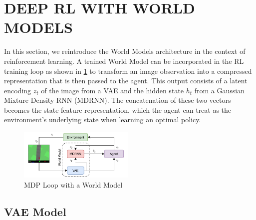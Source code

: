 \section{DEEP RL WITH WORLD MODELS}\label{approach}

In this section, we reintroduce the World Models architecture \cite{ha2018recurrent} in the context of reinforcement learning. A trained World Model can be incorporated in the RL training loop as shown in \cref{fig:worldmodel} to transform an image observation into a compressed representation that is then passed to the agent. This output consists of a latent encoding $z_t$ of the image from a VAE and the hidden state $h_t$ from a Gaussian Mixture Density RNN (MDRNN). The concatenation of these two vectors becomes the state feature representation, which the agent can treat as the environment's underlying state when learning an optimal policy.
\begin{figure}[h]
	\centering
	\includegraphics[width=0.49\textwidth]{images/worldmodel2.pdf}
	\caption{MDP Loop with a World Model}\label{fig:worldmodel}
\end{figure}

\subsection{VAE Model}

